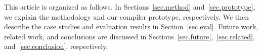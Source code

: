 This article is organized as follows. 
%
In Sections~\ref{sec.method} and~\ref{sec.prototype}, we explain the {\TLA} methodology and our compiler prototype, respectively.
%
We then describe the case studies and evaluation results in Section~\ref{sec.eval}.
%
Future work, related work, and conclusions are discussed in Sections~\ref{sec.future},~\ref{sec.related}, and~\ref{sec.conclusion}, respectively.

\fi